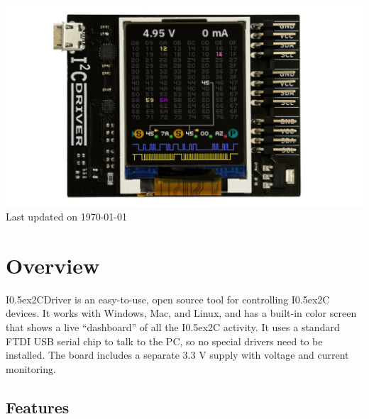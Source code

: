 \documentclass{article}
\newcommand{\two}{\raise0.5ex\hbox{\footnotesize{2}}}
\newcommand{\iic}{I\two{}C}
\newcommand{\iicdriver}{I\two{}CDriver}
\begin{document}
\newpage
\begin{center}
\includegraphics[width=1.00\textwidth]{img/i2cdriver/hero}
Last updated on \today
\end{center}
\tableofcontents

\newpage

\setlength{\parindent}{0mm}
\setlength{\parskip}{1mm}

\section{Overview}

\iicdriver{} is an easy-to-use, open source tool for controlling \iic{} devices. It works with Windows, Mac, and Linux, and has a built-in color screen that shows a live “dashboard” of all the \iic{} activity. It uses a standard FTDI USB serial chip to talk to the PC, so no special drivers need to be installed. The board includes a separate 3.3 V supply with voltage and current monitoring.

\subsection{Features}
\end{document}
